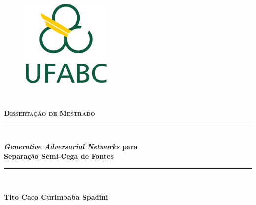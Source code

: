 \begin{titlepage}
		\newcommand{\HRule}{\rule{\linewidth}{0.5mm}}

		\center

		\begin{figure}
			\centering
			\includegraphics[width=0.4\textwidth]{figs/logo_ufabc.png}
		\end{figure}

		\\[0.5cm]
		\textsc{\textbf{\Large Dissertação de Mestrado}}\\[0.5cm] %


		\vspace{1.0cm}

		\HRule \\[0.4cm]
		{ \huge \bfseries \textit{Generative Adversarial Networks} para \\[0.5cm] Separação Semi-Cega de Fontes}\\[0.25cm] %
		\HRule \\[1.0cm]

		\vspace{0.5cm}


		\vspace{1.0cm}

		\textbf{\LARGE Tito Caco Curimbaba Spadini}\\[1.0cm]


\end{titlepage}
